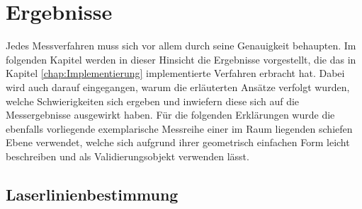 \chapter{Ergebnisse}
Jedes Messverfahren muss sich vor allem durch seine Genauigkeit behaupten. Im folgenden Kapitel werden in dieser Hinsicht die Ergebnisse vorgestellt, die das in Kapitel \ref{chap:Implementierung} implementierte Verfahren erbracht hat. Dabei wird auch darauf eingegangen, warum die erläuterten Ansätze verfolgt wurden, welche Schwierigkeiten sich ergeben und inwiefern diese sich auf die Messergebnisse ausgewirkt haben. Für die folgenden Erklärungen wurde die ebenfalls vorliegende exemplarische Messreihe einer im Raum liegenden schiefen Ebene verwendet, welche sich aufgrund ihrer geometrisch einfachen Form leicht beschreiben und als Validierungsobjekt verwenden lässt.   

\section{Laserlinienbestimmung}
\label{subsec:segmentierung}

